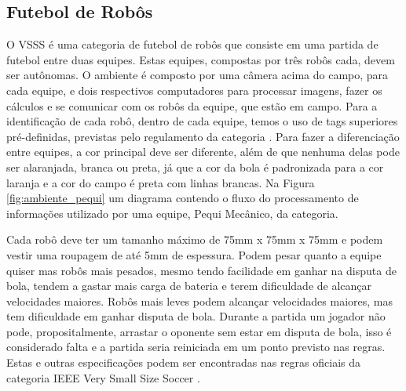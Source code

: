 
\subsection{Futebol de Robôs}
\label{subsec:futebol_robo}

O VSSS é uma categoria de futebol de robôs que consiste em uma partida de futebol entre duas equipes. Estas equipes, compostas por três robôs cada, devem ser autônomas. O ambiente é composto por uma câmera acima do campo, para cada equipe, e dois respectivos computadores para processar imagens, fazer os cálculos e se comunicar com os robôs da equipe, que estão em campo. Para a identificação de cada robô, dentro de cada equipe, temos o uso de tags superiores pré-definidas, previstas pelo regulamento da categoria \cite{regras_vss2023}. Para fazer a diferenciação entre equipes, a cor principal deve ser diferente, além de que nenhuma delas pode ser alaranjada, branca ou preta, já que a cor da bola é padronizada para a cor laranja e a cor do campo é preta com linhas brancas. Na Figura \ref{fig:ambiente_pequi} um diagrama contendo o fluxo do processamento de informações utilizado por uma equipe, Pequi Mecânico, da categoria.


Cada robô deve ter um tamanho máximo de 75mm x 75mm x 75mm e podem vestir uma roupagem de até 5mm de espessura. Podem pesar quanto a equipe quiser mas robôs mais pesados, mesmo tendo facilidade em ganhar na disputa de bola, tendem a gastar mais carga de bateria e terem dificuldade de alcançar velocidades maiores. Robôs mais leves podem alcançar velocidades maiores, mas tem dificuldade em ganhar disputa de bola. Durante a partida um jogador não pode, propositalmente, arrastar o oponente sem estar em disputa de bola, isso é considerado falta e a partida seria reiniciada em um ponto previsto nas regras. Estas e outras especificações podem ser encontradas nas regras oficiais da categoria IEEE Very Small Size Soccer \cite{regras_vss2023}.

